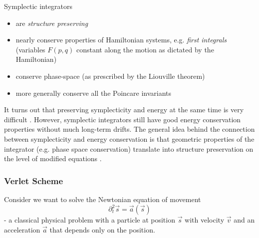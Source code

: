 Symplectic integrators

\begin{itemize}
  \item are \textit{structure preserving}
  \item nearly conserve properties of Hamiltonian systems, e.g. \textit{first integrals} (variables $F(p,q)$ constant along the motion as dictated by the Hamiltonian)
  \item conserve phase-space (as prescribed by the Liouville theorem)
  \item more generally conserve all the Poincare invariants
\end{itemize}


It turns out that preserving symplecticity and energy at the same time is very difficult \citep{Hairer06b}. However, symplectic integrators still have good energy conservation properties without much long-term drifts. The general idea behind the connection between symplecticity and energy conservation is that geometric properties of the integrator (e.g. phase space conservation) translate into structure preservation on the level of modified equations \citep[preface and chapters X through XII]{Hairer06}.


\subsubsection{Verlet Scheme}
Consider we want to solve the Newtonian equation of movement
\begin{equation}
  \partial_t^2 \vec{s} = \vec{a}(\vec{s})
\end{equation}
- a classical physical problem with a particle at position $\vec{s}$ with velocity $\vec{v}$ and an acceleration $\vec{a}$ that depends only on the position.

